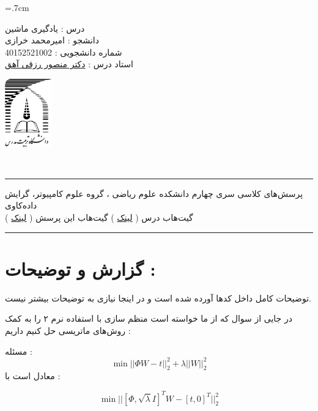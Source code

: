 \documentclass[a4paper, 12pt]{article}
\begin{document}
	
\noindent
\begin{minipage}[c]{5cm}
	\baselineskip=.7cm
	\begin{flushright}
		درس : یادگیری ماشین 
		\\
		دانشجو :
		امیرمحمد خرازی
		\\
		شماره دانشجویی :
		40152521002 
		\\
		استاد درس :  
		\href{mrezghi.ir}{دکتر منصور رزقی آهق}
	\end{flushright}
\end{minipage}
\hfill
\begin{minipage}[c]{3cm}
	\begin{center}
		\href{modares.ac.ir}{
			\includegraphics[width=2cm]{logo.png}}
	\end{center}	
\end{minipage}
\\[1mm]
\hrule depth .5mm \relax
\begin{flushright}
	پرسش‌های کلاسی سری چهارم
	\hfill
	دانشکده علوم ریاضی ، گروه علوم کامپیوتر، گرایش داده‌کاوی
	\\
	\vspace{5mm}
	گیت‌هاب درس (
	\href{https://github.com/A-M-Kharazi/Machine-Learning-TMU.git}{لینک}
	)
	\hfill
	گیت‌هاب این پرسش (
	\href{https://github.com/A-M-Kharazi/Machine-Learning-TMU/tree/main/Questions/Q-Series4}{لینک}
	)
\end{flushright}

\hrule depth .5mm\relax


\section*{گزارش و توضیحات : }

توضیحات کامل داخل کد‌ها آورده شده است و در اینجا نیازی به توضیحات بیشتر نیست.

در جایی از سوال که از ما خواسته است منظم‌ سازی با استفاده نرم ۲ را به کمک روش‌های ماتریسی حل کنیم داریم :

مسئله : 
\[
\min ||\Phi W - t || _2^2 + \lambda ||W||_2^2
\]
معادل است با :

\[
\min ||[\Phi, \sqrt{\lambda}I]^T W - [t, 0]^T ||_2^2
\]
\end{document}
